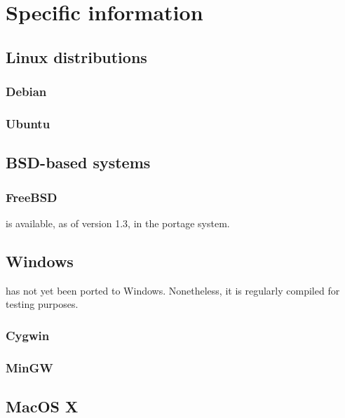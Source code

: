 \documentclass[a4paper,10pt,twoside]{report}
\begin{document}
\chapter{Specific information}

\section{Linux distributions}

\subsection{Debian}

\subsection{Ubuntu}
%
\section{BSD-based systems}

\subsection{FreeBSD}

\CS is available, as of version 1.3, in the portage system.

\section{Windows}

\CS has not yet been ported to Windows. Nonetheless, it is regularly
compiled for testing purposes.

\subsection{Cygwin}

\subsection{MinGW}
%
%
\section{MacOS X}
\end{document}
